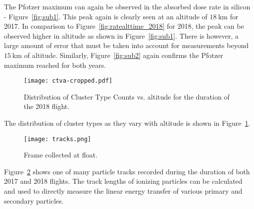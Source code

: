 The Pfotzer maximum can again be observed in the absorbed dose rate in silicon - Figure~\ref{fig:sub1}.  This peak again is clearly seen at an altitude of $\SI{18}{\kilo\meter}$ for 2017.  In comparison to Figure~\ref{fig:ratealttime_2018} for 2018, the peak can be observed higher in altitude as shown in Figure~\ref{fig:sub1}.  There is however, a large amount of error that must be taken into account for measurements beyond $\SI{15}{\kilo\meter}$ of altitude. 
Similarly, Figure~\ref{fig:sub2} again confirms the Pfotzer maximum reached for both years.
\begin{figure}[H]
\centering
\texttt{[image: ctva-cropped.pdf]}
\caption{Distribution of Cluster Type Counts vs. altitude for the duration of the 2018 flight.}
\label{fig:cluster2018}
\end{figure}
The distribution of cluster types as they vary with altitude is shown in Figure~\ref{fig:cluster2018}.  
\begin{figure}[H]
\centering
\texttt{[image: tracks.png]}
\caption{Frame collected at float.}
\label{fig:frame1}
\end{figure}
Figure~\ref{fig:frame1} shows one of many particle tracks recorded during the duration of both 2017 and 2018 flights.  The track lengths of ionizing particles can be calculated and used to directly measure the linear energy transfer of various primary and secondary particles.


